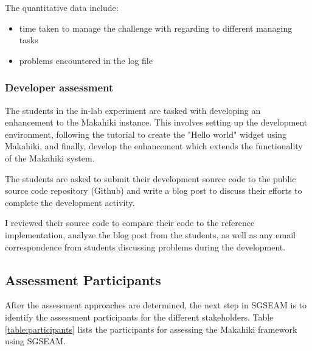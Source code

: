 The quantitative data include:
\begin{itemize}
 \item time taken to manage the challenge with regarding to different managing tasks
 \item problems encountered in the log file
\end{itemize}

\subsubsection{Developer assessment}

The students in the in-lab experiment are tasked with developing an enhancement to the Makahiki instance. This involves setting up the development environment, following the tutorial to create the "Hello world" widget using Makahiki, and finally, develop the enhancement which extends the functionality of the Makahiki system.

The students are asked to submit their development source code to the public source code repository (Github) and write a blog post to discuss their efforts to complete the development activity.

I reviewed their source code to compare their code to the reference implementation, analyze the blog post from the students, as well as any email correspondence from students discussing  problems during the development.

\subsection{Assessment Participants}

After the assessment approaches are determined, the next step in SGSEAM is to identify the assessment participants for the different stakeholders. Table \autoref{table:participants} lists the participants for assessing the Makahiki framework using SGSEAM. 

